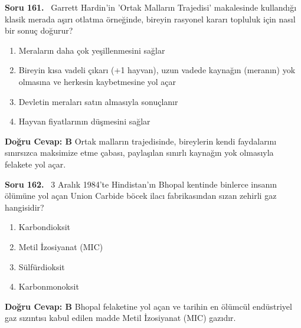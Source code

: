 \documentclass[11pt,a4paper,openany]{book}
\begin{document}
\needspace{5cm}
\vspace{8pt}
\noindent\textbf{\large\sffamily Soru 161.} \ Garrett Hardin'in 'Ortak Malların Trajedisi' makalesinde kullandığı klasik merada aşırı otlatma örneğinde, bireyin rasyonel kararı topluluk için nasıl bir sonuç doğurur?
\begin{enumerate}[label=\Alph*), leftmargin=25pt, topsep=4pt, itemsep=2pt]
    \item Meraların daha çok yeşillenmesini sağlar
    \item Bireyin kısa vadeli çıkarı (+1 hayvan), uzun vadede kaynağın (meranın) yok olmasına ve herkesin kaybetmesine yol açar
    \item Devletin meraları satın almasıyla sonuçlanır
    \item Hayvan fiyatlarının düşmesini sağlar
\end{enumerate}
\vspace{4pt}
\begin{tcolorbox}[title=Cevap ve Açıklama, colback=gray!3!white, colframe=primarycolor!90!black, arc=2mm, fonttitle=\bfseries\sffamily, top=6pt, bottom=6pt]
    \textbf{Doğru Cevap: B}
    \vspace{2pt}
    Ortak malların trajedisinde, bireylerin kendi faydalarını sınırsızca maksimize etme çabası, paylaşılan sınırlı kaynağın yok olmasıyla felakete yol açar.
\end{tcolorbox}
\vspace{10pt}

\needspace{5cm}
\vspace{8pt}
\noindent\textbf{\large\sffamily Soru 162.} \ 3 Aralık 1984'te Hindistan'ın Bhopal kentinde binlerce insanın ölümüne yol açan Union Carbide böcek ilacı fabrikasından sızan zehirli gaz hangisidir?
\begin{enumerate}[label=\Alph*), leftmargin=25pt, topsep=4pt, itemsep=2pt]
    \item Karbondioksit
    \item Metil İzosiyanat (MIC)
    \item Sülfürdioksit
    \item Karbonmonoksit
\end{enumerate}
\vspace{4pt}
\begin{tcolorbox}[title=Cevap ve Açıklama, colback=gray!3!white, colframe=primarycolor!90!black, arc=2mm, fonttitle=\bfseries\sffamily, top=6pt, bottom=6pt]
    \textbf{Doğru Cevap: B}
    \vspace{2pt}
    Bhopal felaketine yol açan ve tarihin en ölümcül endüstriyel gaz sızıntısı kabul edilen madde Metil İzosiyanat (MIC) gazıdır.
\end{tcolorbox}
\vspace{10pt}
\end{document}
